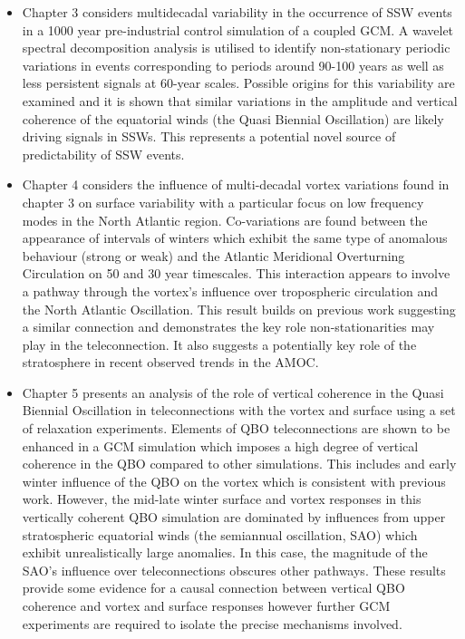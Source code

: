\begin{itemize}
    \item Chapter 3 considers multidecadal variability in the occurrence of SSW events in a 1000 year pre-industrial control simulation of a coupled GCM. A wavelet spectral decomposition analysis is utilised to identify non-stationary periodic variations in events corresponding to periods around 90-100 years as well as less persistent signals at 60-year scales. Possible origins for this variability are examined and it is shown that similar variations in the amplitude and vertical coherence of the equatorial winds (the Quasi Biennial Oscillation) are likely driving signals in SSWs. This represents a potential novel source of predictability of SSW events.
    
    \item Chapter 4 considers the influence of multi-decadal vortex variations found in chapter 3 on surface variability with a particular focus on low frequency modes in the North Atlantic region. Co-variations are found between the appearance of intervals of winters which exhibit the same type of anomalous behaviour (strong or weak) and the Atlantic Meridional Overturning Circulation on 50 and 30 year timescales. This interaction appears to involve a pathway through the vortex's influence over tropospheric circulation and the North Atlantic Oscillation. This result builds on previous work suggesting a similar connection and demonstrates the key role non-stationarities may play in the teleconnection. It also suggests a potentially key role of the stratosphere in recent observed trends in the AMOC. 
    
    \item Chapter 5 presents an analysis of the role of vertical coherence in the Quasi Biennial Oscillation in teleconnections with the vortex and surface using a set of relaxation experiments. Elements of QBO teleconnections are shown to be enhanced in a GCM simulation which imposes a high degree of vertical coherence in the QBO compared to other simulations. This includes and early winter influence of the QBO on the vortex which is consistent with previous work. However, the mid-late winter surface and vortex responses in this vertically coherent QBO simulation are dominated by influences from upper stratospheric equatorial winds (the semiannual oscillation, SAO) which exhibit unrealistically large anomalies. In this case, the magnitude of the SAO's influence over teleconnections obscures other pathways. These results provide some evidence for a causal connection between vertical QBO coherence and vortex and surface responses however further GCM experiments are required to isolate the precise mechanisms involved.  
\end{itemize}

